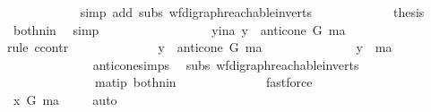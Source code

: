 \begin{isabellebody}
\ \ \ \ \ \ \ \ \ \ \isamarkupfalse%
\ {\isacharparenleft}{\kern0pt}simp\ add{\isacharcolon}{\kern0pt}\ subs\ wf{\isacharunderscore}{\kern0pt}digraph{\isachardot}{\kern0pt}reachable{}{\isacharunderscore}{\kern0pt}in{\isacharunderscore}{\kern0pt}verts{\isacharparenleft}{\kern0pt}{}{\isacharparenright}{\kern0pt}{\isacharparenright}{\kern0pt}\ \isanewline
\ \ \ \ \ \ \ \ \isamarkupfalse%
\ \isamarkupfalse%
\ {\isacharquery}{\kern0pt}thesis\ \isamarkupfalse%
\ both{\isacharunderscore}{\kern0pt}nin\ \isamarkupfalse%
\ simp\ \isanewline
\ \ \ \ \ \ \isamarkupfalse%
\isanewline
\ \ \ \ \ \ \ \ \isamarkupfalse%
\ y{\isacharunderscore}{\kern0pt}ina{\isacharcolon}{\kern0pt}\ {\isachardoublequoteopen}y\ {\isasymin}\ anticone\ G\ ma{\isachardoublequoteclose}\ \isanewline
\ \ \ \ \ \ \ \ \isamarkupfalse%
{\isacharparenleft}{\kern0pt}rule\ ccontr{\isacharparenright}{\kern0pt}\ \isanewline
\ \ \ \ \ \ \ \ \ \ \isamarkupfalse%
\ {\isachardoublequoteopen}{\isasymnot}\ y\ {\isasymin}\ anticone\ G\ ma\ {\isachardoublequoteclose}\isanewline
\ \ \ \ \ \ \ \ \ \ \isamarkupfalse%
\ \isamarkupfalse%
\ {\isachardoublequoteopen}y\ {\isacharequal}{\kern0pt}\ ma{\isachardoublequoteclose}\isanewline
\ \ \ \ \ \ \ \ \ \ \ \ \isamarkupfalse%
\ anticone{\isachardot}{\kern0pt}simps\ \isamarkupfalse%
\ subs\ wf{\isacharunderscore}{\kern0pt}digraph{\isachardot}{\kern0pt}reachable{}{\isacharunderscore}{\kern0pt}in{\isacharunderscore}{\kern0pt}verts{\isacharparenleft}{\kern0pt}{}{\isacharparenright}{\kern0pt}\ {}{\isacharparenleft}{\kern0pt}{}{\isacharcomma}{\kern0pt}{}{\isacharparenright}{\kern0pt}\ \isanewline
\ \ \ \ \ \ \ \ \ \ \ \ \ \ ma{\isacharunderscore}{\kern0pt}tip\ both{\isacharunderscore}{\kern0pt}nin\isanewline
\ \ \ \ \ \ \ \ \ \ \ \ \isamarkupfalse%
\ fastforce\ \ \isanewline
\ \ \ \ \ \ \ \ \ \ \isamarkupfalse%
\ \isamarkupfalse%
\ {\isachardoublequoteopen}x\ {\isasymrightarrow}\isactrlsup {\isacharplus}{\kern0pt}\isactrlbsub G\isactrlesub \ ma{\isachardoublequoteclose}\ \isamarkupfalse%
\ {}{\isacharparenleft}{\kern0pt}{}{\isacharparenright}{\kern0pt}\ \isamarkupfalse%
\ auto\isanewline
\ \ \ \ \ \ \ \ \ \ \isamarkupfalse%
\ \isamarkupfalse%

\end{isabellebody}
